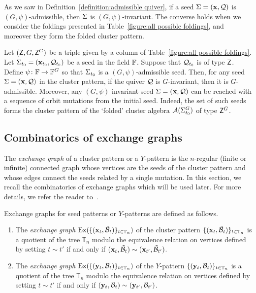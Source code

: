As we saw in Definition~\ref{definition:admissible quiver}, if a seed $\Sigma = 
(\mathbf{x}, \mathcal{Q})$ is $(G,\psi)$-admissible, then $\Sigma$ is 
$(G,\psi)$-invariant. 
The converse holds when we consider the foldings presented in Table~\ref{figure:all possible foldings}, and moreover they form the folded cluster pattern.
\begin{theorem}[{\cite{AL2021}}]\label{thm_invariant_seeds_form_folded_pattern}
Let $(\mathsf{Z}, G, {\mathsf{Z}^G})$ be a triple given by a column of Table~\ref{figure:all 
possible foldings}.
Let $\Sigma_{t_0} = (\mathbf{x}_{t_0},\mathcal{Q}_{t_0})$ be a seed in the field $\mathbb{F}$. Suppose that $\mathcal{Q}_{t_0}$ is of type $\mathsf{Z}$. Define $\psi 
\colon \mathbb{F}  \to \mathbb{F}^G$ so that $\Sigma_{t_0}$ is a $(G, \psi)$-admissible 
seed. Then, for any seed $\Sigma = (\mathbf{x}, \mathcal{Q})$ in the cluster pattern, 
if the quiver $\mathcal{Q}$ is $G$-invariant, then it is $G$-admissible.
Moreover, any $(G,\psi)$-invariant seed $\Sigma = (\mathbf{x}, \mathcal{Q})$ can be 
reached with a sequence of orbit mutations from the 
initial seed. Indeed,  the set of such seeds forms the cluster 
pattern of the `folded' cluster algebra $\mathcal{A}(\Sigma_{t_0}^G)$ of type ${\mathsf{Z}^G}$.
\end{theorem}


\subsection{Combinatorics of exchange graphs}
\label{sec_comb_of_exchange_graphs}
The \emph{exchange graph} of a cluster pattern or a $Y$-pattern is the $n$-regular (finite or
infinite) connected graph whose vertices are the seeds of the cluster pattern
and whose edges connect the seeds related by a single mutation. 
In this section, we recall the combinatorics of exchange
graphs which will be used later. For more details, we refer the reader
to~\cite{FZ2_2003, FZ_Ysystem03, FZ4_2007}.

\begin{definition}
Exchange graphs for seed patterns or $Y$-patterns are defined as follows.
\begin{enumerate}
\item The \emph{exchange graph} $\operatorname{Ex}(\{(\mathbf{x}_t, \mathcal{\tilde{B}}_t)\}_{t \in \mathbb T_n})$ of the cluster pattern $\{(\mathbf{x}_t, \mathcal{\tilde{B}}_t)\}_{t \in \mathbb T_n}$ is a quotient of the tree $\mathbb{T}_n$ modulo the equivalence relation on vertices defined by setting $t \sim t'$ if and only if $(\mathbf{x}_t, \mathcal{\tilde{B}}_t) \sim (\mathbf{x}_{t'},\mathcal{\tilde{B}}_{t'})$. 
\item The \emph{exchange graph} $\operatorname{Ex}(\{(\mathbf{y}_t, \mathcal{B}_t)\}_{t \in \mathbb T_n})$ of the $Y$-pattern $\{(\mathbf{y}_t, \mathcal{B}_t)\}_{t \in \mathbb T_n}$ is a quotient of the tree $\mathbb{T}_n$ modulo the equivalence relation on vertices defined by setting $t \sim t'$ if and only if $(\mathbf{y}_t, \mathcal{B}_t) \sim (\mathbf{y}_{t'},\mathcal{B}_{t'})$. 
\end{enumerate}
\end{definition} 

